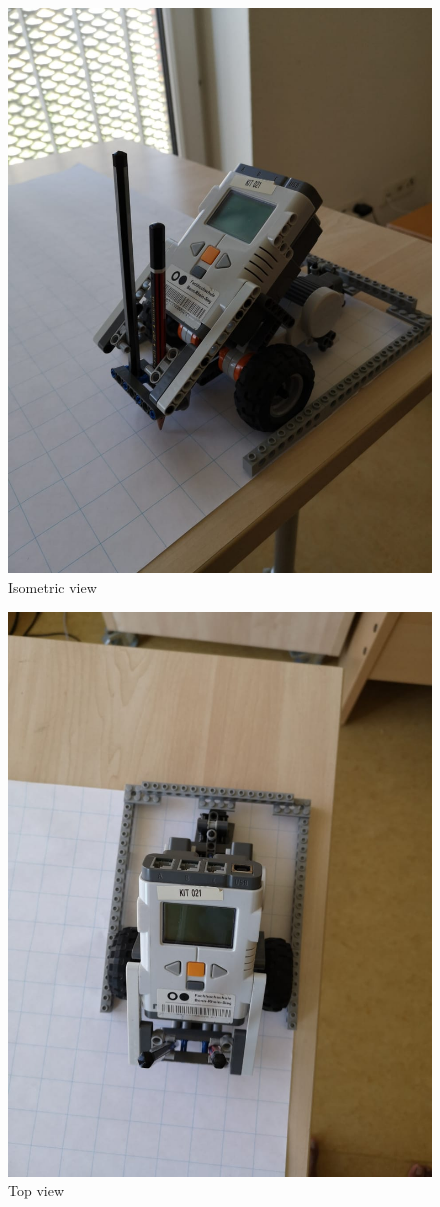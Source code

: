 \documentclass[11pt,a4paper]{article}
\begin{document}
\begin{figure}[H]
\centering
  \centering
  \includegraphics[width=0.8\linewidth]{isometric}
  \caption{Isometric view}
  \label{fig:iso}
\end{figure}

\begin{figure}[H]
\centering
  \centering
  \includegraphics[width=0.8\linewidth]{Top}
  \caption{Top view}
  \label{fig:top}
\end{figure}
\end{document}
